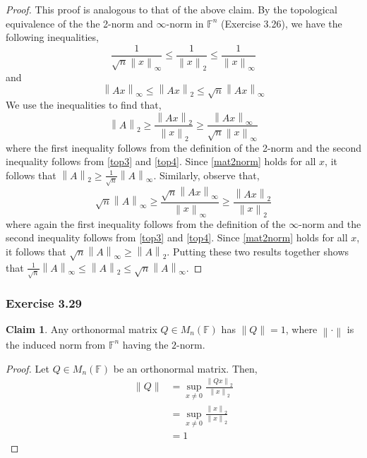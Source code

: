 \documentclass[letterpaper,12pt]{article}
\theoremstyle{definition}
\newtheorem{claim}[theorem]{Claim}
\newcommand{\norm}[1]{\left\lVert#1\right\rVert}
\begin{document}
\begin{proof}
	This proof is analogous to that of the above claim.  By the topological equivalence of the the 2-norm and $\infty$-norm in $\mathbb{F}^n$ (Exercise 3.26), we have the following inequalities,
	\begin{equation}\label{top3}
	\frac{1}{\sqrt{n}\norm{x}_{\infty}} \leq \frac{1}{\norm{x}_2} \leq \frac{1}{\norm{x}_{\infty}}
	\end{equation}
	and
	\begin{equation}\label{top4}
	\norm{Ax}_{\infty} \leq \norm{Ax}_2 \leq \sqrt{n} \norm{Ax}_{\infty}
	\end{equation}
	We use the inequalities to find that,
	\begin{equation}\label{mat2norm}
	\norm{A}_2 \geq \frac{\norm{Ax}_2}{\norm{x}_2}
					 \geq \frac{\norm{Ax}_{\infty}}{\sqrt{n}\norm{x}_{\infty}}
	\end{equation}
	where the first inequality follows from the definition of the 2-norm and the second inequality follows from \eqref{top3} and \eqref{top4}. Since \eqref{mat2norm} holds for all $x$, it follows that $\norm{A}_2 \geq \frac{1}{\sqrt{n}} \norm{A}_{\infty}$. Similarly, observe that,
	\begin{equation}
	\sqrt{n}\norm{A}_{\infty} \geq \frac{\sqrt{n}\norm{Ax}_{\infty}}{\norm{x}_{\infty}} \geq \frac{\norm{Ax}_2}{\norm{x}_2}
	\end{equation}
	where again the first inequality follows from the definition of the $\infty$-norm and the second inequality follows from \eqref{top3} and \eqref{top4}. Since \eqref{mat2norm} holds for all $x$, it follows that $\sqrt{n}\norm{A}_{\infty} \geq \norm{A}_2$. Putting these two results together shows that  $\frac{1}{\sqrt{n}} \norm{A}_{\infty} \leq \norm{A}_2 \leq \sqrt{n}\norm{A}_{\infty}$. 
\end{proof}

\subsubsection*{Exercise 3.29}
\begin{claim}
	Any orthonormal matrix $Q \in M_n(\mathbb{F})$ has $\norm{Q} = 1$, where $\norm{\cdot}$ is the induced norm from $\mathbb{F}^n$ having the $2$-norm.
\end{claim}
\begin{proof}
	Let $Q \in M_n(\mathbb{F})$ be an orthonormal matrix. Then, 
	\begin{align*}
		\norm{Q}  &= \sup_{x\neq 0} \frac{\norm{Qx}_2}{\norm{x}_2} \\
		&=  \sup_{x\neq 0} \frac{\norm{x}_2}{\norm{x}_2} \tag{orthonormal transformations preserve lengths} \\
		&= 1
	\end{align*}
\end{proof}
\end{document}
